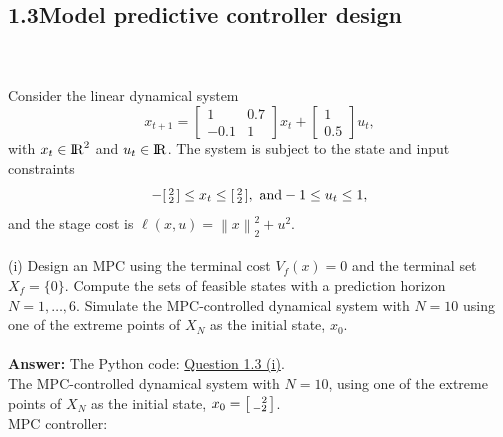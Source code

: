 \documentclass[a4paper,11pt,reqno]{amsart}
\newcommand{\R}{{\rm I\!R}}
\begin{document}
\subsection*{1.3\quad Model predictive controller design}\label{sec:q3}
\
\\ \\
Consider the linear dynamical system
\begin{equation}
    x_{t+1}=
    \begin{bmatrix}
        1&0.7\\
        -0.1&1
    \end{bmatrix}
    x_t+
    \begin{bmatrix}
        1\\
        0.5
    \end{bmatrix}
    u_t,
\end{equation}
with $x_t\in\R^2$ and $u_t\in\R$. The system is subject to the state and input constraints
\begin{equation}
    -
    \begin{bsmallmatrix}
        2\\
        2
    \end{bsmallmatrix}
    \leq x_t\leq
    \begin{bsmallmatrix}
        2\\
        2
    \end{bsmallmatrix},\
    \text{and} -1\leq u_t\leq 1,
    \label{eq:q2_constraints}
\end{equation}
and the stage cost is $\ell(x,u)=\left\lVert x\right\rVert ^2_2+u^2$.
\\ \\
(i) Design an MPC using the terminal cost $V_f(x)=0$ and the terminal set $X_f=\{0\}$. Compute the 
sets of feasible states with a prediction horizon $N=1,\ldots,6.$ Simulate the MPC-controlled dynamical 
system with $N=10$ using one of the extreme points of $X_N$ as the initial state, $x_0$.
\\ \\
\textbf{Answer:} 
The Python code: \href{https://github.com/Gczmy/ELE8088/blob/main/Coursework1/Python_code/3_i.py}{Question 1.3 (i)}.
\\
The MPC-controlled dynamical system with $N=10$, using one of the extreme points of $X_N$ as the initial state, $x_0=\begin{bsmallmatrix}\ \ 2\\-2\end{bsmallmatrix}$.
\\
MPC controller:
\end{document}
